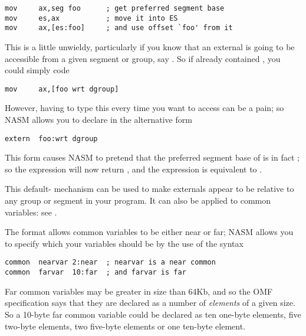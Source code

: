 \begin{lstlisting}
mov     ax,seg foo      ; get preferred segment base
mov     es,ax           ; move it into ES
mov     ax,[es:foo]     ; and use offset `foo' from it
\end{lstlisting}

This is a little unwieldy, particularly if you know that an external
is going to be accessible from a given segment or group, say
. So if  already contained ,
you could simply code

\begin{lstlisting}
mov     ax,[foo wrt dgroup]
\end{lstlisting}

However, having to type this every time you want to access 
can be a pain; so NASM allows you to declare  in the
alternative form

\begin{lstlisting}
extern  foo:wrt dgroup
\end{lstlisting}

This form causes NASM to pretend that the preferred segment base of
 is in fact ; so the expression 
will now return , and the expression  is
equivalent to .

This default- mechanism can be used
to make externals appear to be relative to any group or segment in
your program. It can also be applied to common variables: see
.


The  format allows common variables to be either near
 or far;
NASM allows you to specify which your variables should be by the
use of the syntax

\begin{lstlisting}
common  nearvar 2:near  ; nearvar is a near common
common  farvar  10:far  ; and farvar is far
\end{lstlisting}

Far common variables may be greater in size than 64Kb, and so the
OMF specification says that they are declared as a number of
\emph{elements} of a given size. So a 10-byte far common variable could
be declared as ten one-byte elements, five two-byte elements, two
five-byte elements or one ten-byte element.

